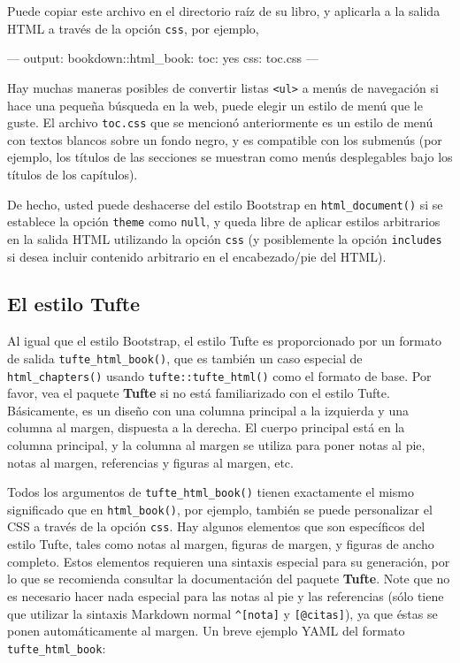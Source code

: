 \documentclass[12pt,]{krantz}
\makeatletter
\newenvironment{Shaded}{\begin{snugshade}}{\end{snugshade}}
\newcommand{\OtherTok}[1]{\textcolor[rgb]{0.56,0.35,0.01}{#1}}
\newcommand{\FunctionTok}[1]{\textcolor[rgb]{0.00,0.00,0.00}{#1}}
\newcommand{\AttributeTok}[1]{\textcolor[rgb]{0.77,0.63,0.00}{#1}}
\newenvironment{kframe}{%
\medskip{}
\setlength{\fboxsep}{.8em}
 \def\at@end@of@kframe{}%
 \ifinner\ifhmode%
  \def\at@end@of@kframe{\end{minipage}}%
  \begin{minipage}{\columnwidth}%
 \fi\fi%
 \def\FrameCommand##1{\hskip\@totalleftmargin \hskip-\fboxsep
 \colorbox{shadecolor}{##1}\hskip-\fboxsep
     \hskip-\linewidth \hskip-\@totalleftmargin \hskip\columnwidth}%
 \MakeFramed {\advance\hsize-\width
   \@totalleftmargin\z@ \linewidth\hsize
   \@setminipage}}%
 {\par\unskip\endMakeFramed%
 \at@end@of@kframe}
\renewenvironment{Shaded}{\begin{kframe}}{\end{kframe}}
\theoremstyle{definition}
\theoremstyle{definition}
\theoremstyle{definition}
\theoremstyle{remark}
\makeatother
\begin{document}
Puede copiar este archivo en el directorio raíz de su libro, y aplicarla
a la salida HTML a través de la opción \texttt{css}, por ejemplo,

\begin{Shaded}
\begin{Highlighting}[]
\OtherTok{---}
\FunctionTok{output:}
  \FunctionTok{bookdown:}\AttributeTok{:html_book:}
    \FunctionTok{toc:}\AttributeTok{ yes}
    \FunctionTok{css:}\AttributeTok{ toc.css}
\OtherTok{---}
\end{Highlighting}
\end{Shaded}

Hay muchas maneras posibles de convertir listas
\texttt{\textless{}ul\textgreater{}} a menús de navegación si hace una
pequeña búsqueda en la web, puede elegir un estilo de menú que le guste.
El archivo \texttt{toc.css} que se mencionó anteriormente es un estilo
de menú con textos blancos sobre un fondo negro, y es compatible con los
submenús (por ejemplo, los títulos de las secciones se muestran como
menús desplegables bajo los títulos de los capítulos).

De hecho, usted puede deshacerse del estilo Bootstrap en
\texttt{html\_document()} si se establece la opción \texttt{theme} como
\texttt{null}, y queda libre de aplicar estilos arbitrarios en la salida
HTML utilizando la opción \texttt{css} (y posiblemente la opción
\texttt{includes} si desea incluir contenido arbitrario en el
encabezado/pie del HTML).

\subsection{El estilo Tufte}\label{el-estilo-tufte}

Al igual que el estilo Bootstrap, el estilo Tufte es proporcionado por
un formato de salida \texttt{tufte\_html\_book()}, que es también un
caso especial de \texttt{html\_chapters()} usando
\texttt{tufte::tufte\_html()} como el formato de base. Por favor, vea el
paquete \textbf{Tufte} \citep{R-tufte} si no está familiarizado con el
estilo Tufte. Básicamente, es un diseño con una columna principal a la
izquierda y una columna al margen, dispuesta a la derecha. El cuerpo
principal está en la columna principal, y la columna al margen se
utiliza para poner notas al pie, notas al margen, referencias y figuras
al margen, etc.

Todos los argumentos de \texttt{tufte\_html\_book()} tienen exactamente
el mismo significado que en \texttt{html\_book()}, por ejemplo, también
se puede personalizar el CSS a través de la opción \texttt{css}. Hay
algunos elementos que son específicos del estilo Tufte, tales como notas
al margen, figuras de margen, y figuras de ancho completo. Estos
elementos requieren una sintaxis especial para su generación, por lo que
se recomienda consultar la documentación del paquete \textbf{Tufte}.
Note que no es necesario hacer nada especial para las notas al pie y las
referencias (sólo tiene que utilizar la sintaxis Markdown normal
\texttt{\^{}{[}nota{]}} y \texttt{{[}@citas{]}}), ya que éstas se ponen
automáticamente al margen. Un breve ejemplo YAML del formato
\texttt{tufte\_html\_book}:
\end{document}
